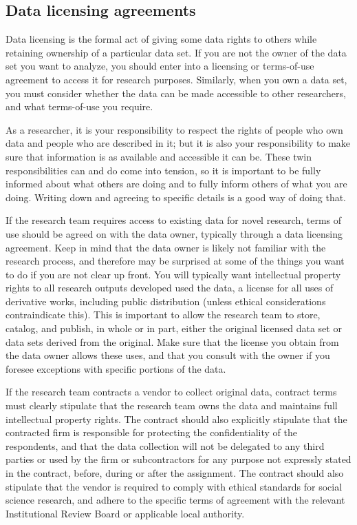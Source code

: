 \subsection{Data licensing agreements}

Data licensing is the formal act of giving some data rights to others
while retaining ownership of a particular data set.
If you are not the owner of the data set you want to analyze,
you should enter into a licensing or terms-of-use agreement to access it for research purposes.
Similarly, when you own a data set,
you must consider whether the data can be made accessible to other researchers,
and what terms-of-use you require. 

As a researcher, it is your responsibility to respect the rights
of people who own data and people who are described in it;
but it is also your responsibility to make sure
that information is as available and accessible it can be.
These twin responsibilities can and do come into tension,
so it is important to be fully informed about what others are doing
and to fully inform others of what you are doing.
Writing down and agreeing to specific details is a good way of doing that.

If the research team requires access to existing data for novel research,
terms of use should be agreed on with the data owner, 
typically through a data licensing agreement.
Keep in mind that the data owner is likely not familiar
with the research process, and therefore may be surprised
at some of the things you want to do if you are not clear up front.
You will typically want intellectual property rights to all research outputs developed used the data,
a license for all uses of derivative works, including public distribution 
(unless ethical considerations contraindicate this).
This is important to allow the research team to store, catalog, and publish, in whole or in part,
either the original licensed data set or data sets derived from the original.
Make sure that the license you obtain from the data owner allows these uses,
and that you consult with the owner if you foresee exceptions with specific portions of the data.

If the research team contracts a vendor to collect original data,
contract terms must clearly stipulate that the research team owns the data
and maintains full intellectual property rights. 
The contract should also explicitly stipulate that the contracted firm
is responsible for protecting the confidentiality of the respondents,
and that the data collection will not be delegated to any third parties
or used by the firm or subcontractors for any purpose not expressly stated in the contract,
before, during or after the assignment. 
The contract should also stipulate that the vendor is required to comply with 
ethical standards for social science research, 
and adhere to the specific terms of agreement with the relevant 
Institutional Review Board or applicable local authority. 

